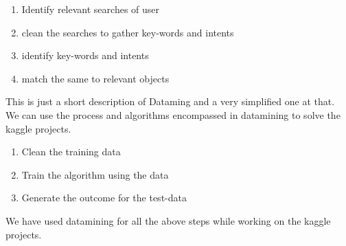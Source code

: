 \documentclass[fleqn,10pt]{SelfArx} %
\begin{document}
\begin{enumerate}
	\item Identify relevant searches of user
	\item clean the searches to gather key-words and intents
	\item identify key-words and intents
	\item match the same to relevant objects	
\end{enumerate}
This is just a short description of Dataming and a very simplified one at that.\\We can use the process and algorithms encompassed in datamining to solve the kaggle projects.
\begin{enumerate}
	\item Clean the training data
	\item Train the algorithm using the data
	\item Generate the outcome for the test-data
\end{enumerate}
We have used datamining for all the above steps while working on the kaggle projects.\\
\end{document}
